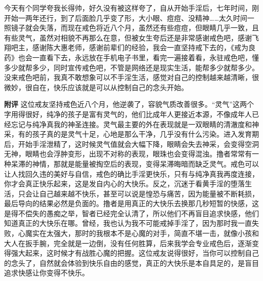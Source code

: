 \begin{case}
    今天有个同学夸我长得帅，好久没有被这样夸了，自从开始手淫后，七年时间，刚开始一两年还行，到了后面脸几乎变了形，大小眼、痘痘、没精神……太久时间一照镜子就会失落，而现在戒色将近八个月，虽然还有些痘痘，但眼睛几乎一致，且有些灵气，虽然对相貌不再那么在意，但被女生夸后还是非常感谢戒色吧，感谢飞翔吧主，感谢陈大惠老师，感谢前辈们的经验，我会一直坚持戒下去的，《戒为良药》也会一直看下去，永远放在手机电子书里，看完一遍接着看，永驻戒色吧，懂多少就帮多少，同时宣传戒色吧，不管是网络还是现实生活，能帮多少就帮多少。没来戒色吧前，我真不敢想象可以不手淫生活，感觉对自己的控制越来越清晰，很微妙，很自在，快乐应该就是可以从控制自己的念头开始。

    \textbf{附评} 这位戒友坚持戒色近八个月，他逆袭了，容貌气质改善很多。“灵气”这两个字用得很好，纯净的孩子是富有灵气的，他们比成年人更接近本源，不像成年人已经忘记与纯净真我的神圣连接。灵气最主要的外在表现就是一双眼睛的清澈度和神采，有的孩子真的是灵气十足，心地是那么干净，几乎没有什么污染。进入发育期后，开始手淫泄精了，这时候灵气值就会大幅下降，眼睛会失去神采，会变得空洞无神，眼睛也会浮肿变形，出现不对称的表现，眼珠也会变得混浊。撸者常常有一种呆滞的神情，那就是能量被掏空后的表现，变得呆滞晦暗而缺乏灵气。戒色可以让人找回久违的美好与自信，戒色的确比手淫更快乐，只有与纯净真我再度连接，你才会真正快乐起来，这是发自内心的大快乐。反之，沉迷于看黄手淫的堕落生活，只会让自己越来越不快乐，甚至可以说是惶恐与痛苦，因为能量被不断耗损，最后导向的结果必然是负面的。撸者是用真正的大快乐去换那几秒短暂的快感，这是得不偿失的愚痴之举，智者已经完全认清了，所以他们不再盲目追求快感，他们知道真正的大快乐在哪。曾经，我也认为我不可能戒掉手淫了，因为那时我一直失败，心魔实在太强大，那时的我根本不是心魔的对手，简直不堪一击，就像小孩和大人在扳手腕，完全就是一边倒，没有任何胜算，后来我学会专业戒色后，逐渐变得强大起来，这时候才有战胜心魔的把握。这位戒友说得很好，当你可以控制自己的念头了，自然就会体验到快乐自由的感觉，真正的大快乐是本自具足的，是盲目追求快感让你变得不快乐。
\end{case}

